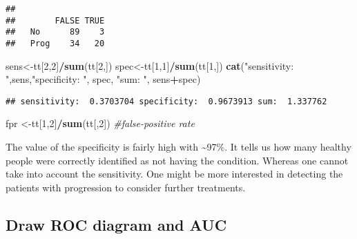 \documentclass[]{article}
\newenvironment{Shaded}{\begin{snugshade}}{\end{snugshade}}
\newcommand{\CommentTok}[1]{\textcolor[rgb]{0.56,0.35,0.01}{\textit{#1}}}
\newcommand{\DecValTok}[1]{\textcolor[rgb]{0.00,0.00,0.81}{#1}}
\newcommand{\KeywordTok}[1]{\textcolor[rgb]{0.13,0.29,0.53}{\textbf{#1}}}
\newcommand{\NormalTok}[1]{#1}
\newcommand{\OperatorTok}[1]{\textcolor[rgb]{0.81,0.36,0.00}{\textbf{#1}}}
\newcommand{\StringTok}[1]{\textcolor[rgb]{0.31,0.60,0.02}{#1}}
\begin{document}
\begin{verbatim}
##       
##        FALSE TRUE
##   No      89    3
##   Prog    34   20
\end{verbatim}

\begin{Shaded}
\begin{Highlighting}[]
\NormalTok{sens<-tt[}\DecValTok{2}\NormalTok{,}\DecValTok{2}\NormalTok{]}\OperatorTok{/}\KeywordTok{sum}\NormalTok{(tt[}\DecValTok{2}\NormalTok{,])}
\NormalTok{spec<-tt[}\DecValTok{1}\NormalTok{,}\DecValTok{1}\NormalTok{]}\OperatorTok{/}\KeywordTok{sum}\NormalTok{(tt[}\DecValTok{1}\NormalTok{,])}
\KeywordTok{cat}\NormalTok{(}\StringTok{"sensitivity: "}\NormalTok{,sens,}\StringTok{"specificity: "}\NormalTok{, spec, }\StringTok{"sum: "}\NormalTok{, sens}\OperatorTok{+}\NormalTok{spec)}
\end{Highlighting}
\end{Shaded}

\begin{verbatim}
## sensitivity:  0.3703704 specificity:  0.9673913 sum:  1.337762
\end{verbatim}

\begin{Shaded}
\begin{Highlighting}[]
\NormalTok{fpr <-tt[}\DecValTok{1}\NormalTok{,}\DecValTok{2}\NormalTok{]}\OperatorTok{/}\KeywordTok{sum}\NormalTok{(tt[,}\DecValTok{2}\NormalTok{]) }\CommentTok{#false-positive rate}
\end{Highlighting}
\end{Shaded}

The value of the specificity is fairly high with \textasciitilde{}97\%.
It tells us how many healthy people were correctly identified as not
having the condition. Whereas one cannot take into account the
sensitivity. One might be more interested in detecting the patients with
progression to consider further treatments.

\hypertarget{draw-roc-diagram-and-auc}{%
\subsection{Draw ROC diagram and AUC}\label{draw-roc-diagram-and-auc}}
\end{document}
